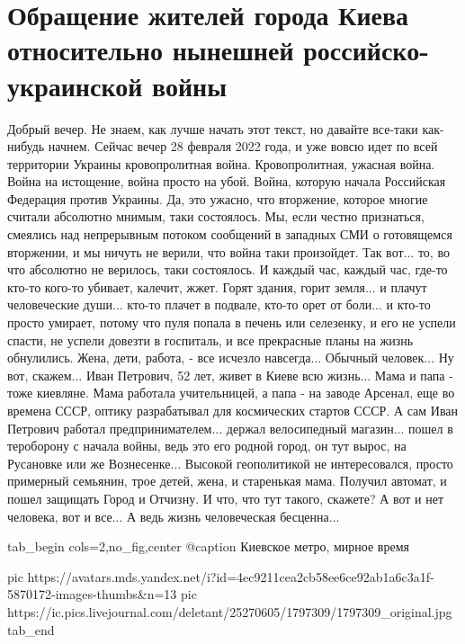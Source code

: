  
 
 
 
 

\section{Обращение жителей города Киева относительно нынешней российско-украинской войны}

Добрый вечер. Не знаем, как лучше начать этот текст, но давайте все-таки
как-нибудь начнем. Сейчас вечер 28 февраля 2022 года, и уже вовсю идет по всей
территории Украины кровопролитная война. Кровопролитная, ужасная война. Война
на истощение, война просто на убой. Война, которую начала Российская Федерация
против Украины. Да, это ужасно, что вторжение, которое многие считали абсолютно
мнимым, таки состоялось. Мы, если честно признаться, смеялись над непрерывным
потоком сообщений в западных СМИ о готовящемся вторжении, и мы ничуть не
верили, что война таки произойдет. Так вот... то, во что абсолютно не верилось,
таки состоялось. И каждый час, каждый час, где-то кто-то кого-то убивает,
калечит, жжет. Горят здания, горит земля... и плачут человеческие души...
кто-то плачет в подвале, кто-то орет от боли... и кто-то просто умирает,
потому что пуля попала в печень или селезенку, и его не успели спасти, не
успели довезти в госпиталь, и все прекрасные планы на жизнь обнулились. Жена,
дети, работа, - все исчезло навсегда... Обычный человек... Ну вот, скажем...
Иван Петрович, 52 лет, живет в Киеве всю жизнь... Мама и папа - тоже киевляне.
Мама работала учительницей, а папа - на заводе Арсенал, еще во времена СССР,
оптику разрабатывал для космических стартов СССР.  А сам Иван Петрович работал
предпринимателем... держал велосипедный магазин... пошел в тероборону с начала
войны, ведь это его родной город, он тут вырос, на Русановке или же
Вознесенке... Высокой геополитикой не интересовался, просто примерный семьянин,
трое детей, жена, и старенькая мама.  Получил автомат, и пошел защищать Город и
Отчизну. И что, что тут такого, скажете? А вот и нет человека, вот и все...  А
ведь жизнь человеческая бесценна...

\ifcmt
  tab_begin cols=2,no_fig,center
		 @caption Киевское метро, мирное время

     pic https://avatars.mds.yandex.net/i?id=4ec9211cea2cb58ee6ce92ab1a6c3a1f-5870172-images-thumbs&n=13
		 pic https://ic.pics.livejournal.com/deletant/25270605/1797309/1797309_original.jpg
  tab_end
\fi

